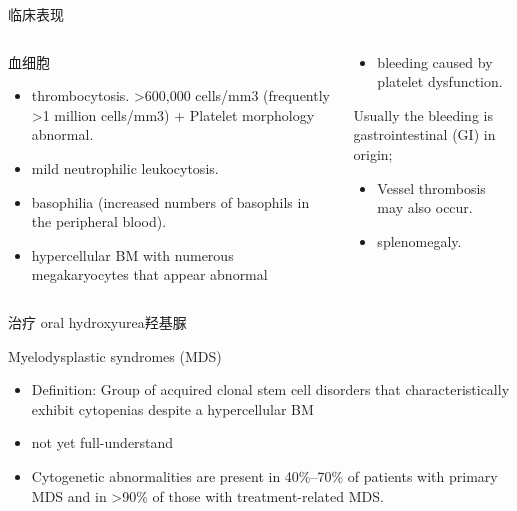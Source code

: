 \documentclass[
  ignorenonframetext,
]{beamer}
\providecommand{\tightlist}{%
  \setlength{\itemsep}{0pt}\setlength{\parskip}{0pt}}
\begin{document}
\begin{frame}
\begin{block}{临床表现}
\protect\hypertarget{ux4e34ux5e8aux8868ux73b0-3}{}
\begin{columns}[T]
\begin{column}{0.3\textwidth}
\begin{block}{血细胞}
\protect\hypertarget{ux8840ux7ec6ux80de}{}
\begin{itemize}
\item
  thrombocytosis. \textgreater600,000 cells/mm3 (frequently
  \textgreater1 million cells/mm3) + Platelet morphology abnormal.
\item
  mild neutrophilic leukocytosis.
\item
  basophilia (increased numbers of basophils in the peripheral blood).
\item
  hypercellular BM with numerous megakaryocytes that appear abnormal
\end{itemize}
\end{block}
\end{column}

\begin{column}{0.3\textwidth}
\begin{itemize}
\tightlist
\item
  bleeding caused by platelet dysfunction.
\end{itemize}

Usually the bleeding is gastrointestinal (GI) in origin;

\begin{itemize}
\item
  Vessel thrombosis may also occur.
\item
  splenomegaly.
\end{itemize}
\end{column}
\end{columns}
\end{block}
\end{frame}

\begin{frame}
\begin{block}{治疗}
\protect\hypertarget{ux6cbbux7597-4}{}
oral hydroxyurea羟基脲
\end{block}
\end{frame}

\begin{frame}
\begin{block}{Myelodysplastic syndromes (MDS)}
\protect\hypertarget{myelodysplastic-syndromes-mds}{}
\begin{itemize}
\item
  Definition: Group of acquired clonal stem cell disorders that
  characteristically exhibit cytopenias despite a hypercellular BM
\item
  not yet full-understand
\item
  Cytogenetic abnormalities are present in 40\%--70\% of patients with
  primary MDS and in \textgreater90\% of those with treatment-related
  MDS.
\end{itemize}
\end{block}
\end{frame}
\end{document}
